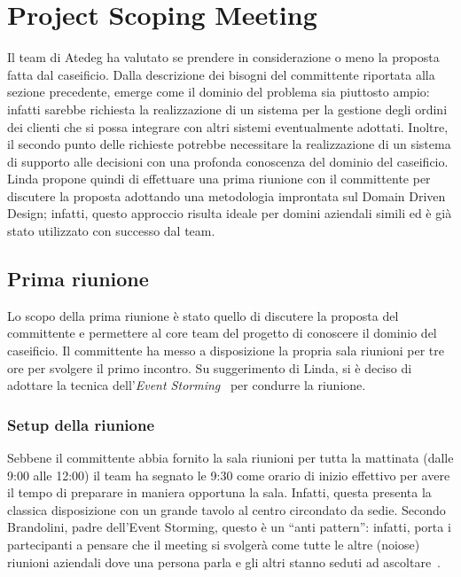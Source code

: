 \section{Project Scoping Meeting}
\label{sec:project-scoping-meeting}

Il team di Atedeg ha valutato se prendere in considerazione o meno la proposta fatta dal caseificio. Dalla descrizione dei bisogni del committente riportata alla sezione precedente, emerge come il dominio del problema sia piuttosto ampio: infatti sarebbe richiesta la realizzazione di un sistema per la gestione degli ordini dei clienti che si possa integrare con altri sistemi eventualmente adottati. Inoltre, il secondo punto delle richieste potrebbe necessitare la realizzazione di un sistema di supporto alle decisioni con una profonda conoscenza del dominio del caseificio.
Linda propone quindi di effettuare una prima riunione con il committente per discutere la proposta adottando una metodologia improntata sul Domain Driven Design; infatti, questo approccio risulta ideale per domini aziendali simili ed è già stato utilizzato con successo dal team.



\subsection{Prima riunione}
\label{sec:prima-riunione}
Lo scopo della prima riunione è stato quello di discutere la proposta del committente e permettere al core team del progetto di conoscere il dominio del caseificio. Il committente ha messo a disposizione la propria sala riunioni per tre ore per svolgere il primo incontro. 
Su suggerimento di Linda, si è deciso di adottare la tecnica dell'\emph{Event Storming}~\cite{cit:event-storming} per condurre la riunione. 


\subsubsection{Setup della riunione}
\label{sec:setup-della-riunione}
Sebbene il committente abbia fornito la sala riunioni per tutta la mattinata (dalle 9:00 alle 12:00) il team ha segnato le 9:30 come orario di inizio effettivo per avere il tempo di preparare in maniera opportuna la sala.
Infatti, questa presenta la classica disposizione con un grande tavolo al centro circondato da sedie. Secondo Brandolini, padre dell'Event Storming, questo è un ``anti pattern'': infatti, porta i partecipanti a pensare che il meeting si svolgerà come tutte le altre (noiose) riunioni aziendali dove una persona parla e gli altri stanno seduti ad ascoltare~\cite[pp.~116-118]{cit:event-storming-book}.

